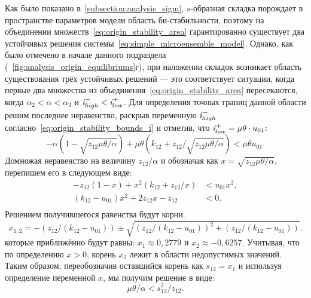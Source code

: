 Как было показано в~\autoref{subsection:analysis_sigm}, $s$-образная складка порождает в пространстве параметров модели область би-стабильности, поэтому на объединении множеств~\eqref{eq:origin_stability_area} гарантированно существует два устойчивых решения системы~\eqref{eq:simple_microensemble_model}. Однако, как было отмечено в начале данного подраздела (\seefigure~\ref{fig:analysis_origin_equilibriums}г), при наложении складок возникает область существования трёх устойчивых решений --- это соответствует ситуации, когда первые два множества из объединения~\eqref{eq:origin_stability_area} пересекаются, \ie когда $\alpha_{2} < \alpha < \alpha_{3}$ и $\mathit{i}_{high}^{-} < \mathit{i}_{low}^{+}$. Для определения точных границ данной области решим последнее неравенство, раскрыв переменную $\mathit{i}_{high}^{-}$ согласно~\eqref{eq:origin_stability_bounds_i} и отметив, что $\mathit{i}_{low}^{+} = \mu \theta \cdot u_{01}$:
\begin{equation}
    \nonumber
    -\alpha \left(1 - \sqrt{z_{12}\mu\theta/\alpha}\right) + \mu \theta \left(k_{12} + z_{12} \big/ \sqrt{z_{12}\mu\theta/\alpha} \right) < \mu \theta u_{01}.
\end{equation}
Домножая неравенство на величину $z_{12} / \alpha$ и обозначая как $x = \sqrt{z_{12}\mu\theta/\alpha}$, перепишем его в следующем виде:
\begin{equation}
    \nonumber
    \begin{aligned}
        -z_{12} (1 - x) + x^{2} (k_{12} + z_{12} / x)   &< u_{01} x^{2}, \\
        (k_{12} - u_{01}) x^{2} + 2 z_{12} x - z_{12}   &< 0. \\
    \end{aligned}
\end{equation}
Решением получившегося равенства будут корни:
\begin{equation}
    \nonumber
    x_{1,2} = -\left(z_{12} / (k_{12} - u_{01})\right) \pm \sqrt{\left(z_{12} / (k_{12} - u_{01})\right)^{2} + \left(z_{12} / (k_{12} - u_{01})\right)}.
\end{equation}
которые приближённо будут равны: $x_{1} \approx 0,2779$ и $x_{2} \approx -0,6257$. Учитывая, что по определению $x > 0$, корень $x_{2}$ лежит в области недопустимых значений. Таким образом, переобозначив оставшийся корень как $s_{12} = x_{1}$ и используя определение переменной $x$, мы получим решение в виде:
\begin{equation}
    \nonumber
    \mu \theta / \alpha < s_{12}^{2} / z_{12}.
\end{equation}

